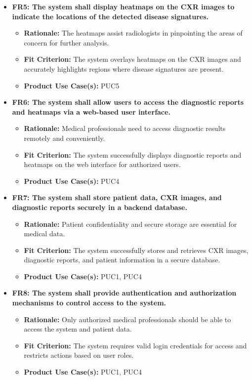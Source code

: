 \documentclass[12pt]{article}
\begin{document}
\begin{itemize}
    \item \textbf{FR5: The system shall display heatmaps on the CXR images to indicate the locations of the detected disease signatures.}
    \begin{itemize}
        \item \textbf{Rationale:} The heatmaps assist radiologists in pinpointing the areas of concern for further analysis.
        \item \textbf{Fit Criterion:} The system overlays heatmaps on the CXR images and accurately highlights regions where disease signatures are present.
        \item \textbf{Product Use Case(s):} PUC5
    \end{itemize}
    
    \item \textbf{FR6: The system shall allow users to access the diagnostic reports and heatmaps via a web-based user interface.}
    \begin{itemize}
        \item \textbf{Rationale:} Medical professionals need to access diagnostic results remotely and conveniently.
        \item \textbf{Fit Criterion:} The system successfully displays diagnostic reports and heatmaps on the web interface for authorized users.
        \item \textbf{Product Use Case(s):} PUC4
    \end{itemize}
    
    \item \textbf{FR7: The system shall store patient data, CXR images, and diagnostic reports securely in a backend database.}
    \begin{itemize}
        \item \textbf{Rationale:} Patient confidentiality and secure storage are essential for medical data.
        \item \textbf{Fit Criterion:} The system successfully stores and retrieves CXR images, diagnostic reports, and patient information in a secure database.
        \item \textbf{Product Use Case(s):} PUC1, PUC4
    \end{itemize}
    
    \item \textbf{FR8: The system shall provide authentication and authorization mechanisms to control access to the system.}
    \begin{itemize}
        \item \textbf{Rationale:} Only authorized medical professionals should be able to access the system and patient data.
        \item \textbf{Fit Criterion:} The system requires valid login credentials for access and restricts actions based on user roles.
        \item \textbf{Product Use Case(s):} PUC1, PUC4
    \end{itemize}
\end{itemize}
\end{document}

